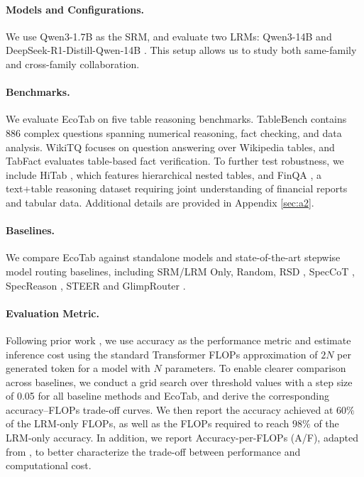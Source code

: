 \documentclass[11pt]{article}
\begin{document}

\paragraph{Models and Configurations.}
We use Qwen3-1.7B \citep{yang2025qwen3} as the SRM, and evaluate two LRMs: Qwen3-14B \citep{yang2025qwen3} and DeepSeek-R1-Distill-Qwen-14B \citep{guo2025deepseek}. This setup allows us to study both same-family and cross-family collaboration.

\paragraph{Benchmarks.} We evaluate EcoTab on five table reasoning benchmarks. 
TableBench \citep{wu2025tablebench} contains 886 complex questions spanning numerical reasoning, fact checking, and data analysis. 
WikiTQ \citep{pasupat2015compositional} focuses on question answering over Wikipedia tables, and TabFact \citep{2019TabFactA} evaluates table-based fact verification. 
To further test robustness, we include HiTab \citep{cheng-etal-2022-hitab}, which features hierarchical nested tables, and FinQA \citep{chen-etal-2021-finqa}, a text+table reasoning dataset requiring joint understanding of financial reports and tabular data. 
Additional details are provided in Appendix \ref{sec:a2}.

\vspace{-4pt}

\paragraph{Baselines.} We compare EcoTab against standalone models and state-of-the-art stepwise model routing baselines, including SRM/LRM Only, Random, RSD \citep{liao2025rewardguided}, SpecCoT \citep{shi-etal-2025-speccot}, SpecReason \citep{pan2025specreason}, STEER \citep{lee2025confidence} and GlimpRouter \citep{zeng2026glimprouter}.

\vspace{-4pt}

\paragraph{Evaluation Metric.}
Following prior work \citep{liao2025rewardguided,sardana2024beyond}, we use accuracy as the performance metric and estimate inference cost using the standard Transformer FLOPs approximation of \(2N\) per generated token for a model with \(N\) parameters. To enable clearer comparison across baselines, we conduct a grid search over threshold values with a step size of 0.05 for all baseline methods and EcoTab, and derive the corresponding accuracy--FLOPs trade-off curves. We then report the accuracy achieved at \(60\%\) of the LRM-only FLOPs, as well as the FLOPs required to reach \(98\%\) of the LRM-only accuracy. In addition, we report Accuracy-per-FLOPs (A/F), adapted from \citep{ma2025cot}, to better characterize the trade-off between performance and computational cost.
\end{document}
